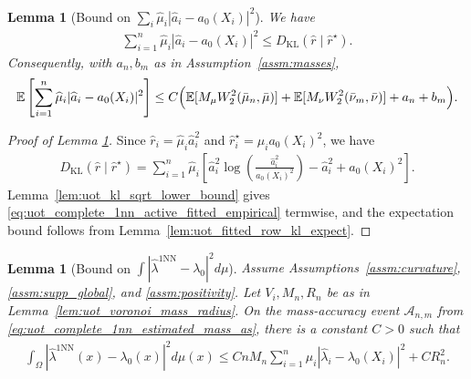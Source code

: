 \documentclass[11pt,reqno]{amsart}
\newtheorem{lemma}[theorem]{Lemma}
\theoremstyle{definition}
\newcommand{\KL}{\mathrm{KL}}
\renewcommand{\hat}{\widehat}
\newcommand{\Ep}{\mathbb{E}}
\begin{document}
\begin{lemma}[Bound on $\sum_i\hat\mu_i|\hat a_i-a_0(X_i)|^2$]
\label{lem:uot_complete_1nn_active_fitted}
We have
\begin{align}
\label{eq:uot_complete_1nn_active_fitted_empirical}
    \sum_{i=1}^n \hat\mu_i
    |\hat a_i-a_0(X_i)|^2
    \le
    {D_\KL}(\hat r\mid \hat r^\star).
\end{align}
Consequently, with $a_n,b_m$ as in Assumption~\ref{assm:masses},
\begin{align}
\label{eq:uot_complete_1nn_active_fitted_expectation}
    \Ep\left[
    \sum_{i=1}^n \hat\mu_i
    |\hat a_i-a_0(X_i)|^2
    \right]
    \le
    C
    \Bigl(
        \Ep[M_\mu W_2^2(\bar\mu_n,\bar\mu)]
        + \Ep[M_\nu W_2^2(\bar\nu_m,\bar\nu)]
        + a_n + b_m
    \Bigr).
\end{align}
\end{lemma}

\begin{proof}[Proof of Lemma \ref{lem:uot_complete_1nn_active_fitted}]
Since $\hat r_i=\hat\mu_i\hat a_i^2$ and $\hat r_i^\star=\hat\mu_i a_0(X_i)^2$, we have
\begin{align*}
    {D_\KL}(\hat r\mid \hat r^\star)
    =
    \sum_{i=1}^n\hat\mu_i
    \left[
        \hat a_i^2
        \log\left(\frac{\hat a_i^2}{a_0(X_i)^2}\right)
        -\hat a_i^2
        +a_0(X_i)^2
    \right].
\end{align*}
Lemma~\ref{lem:uot_kl_sqrt_lower_bound} gives \eqref{eq:uot_complete_1nn_active_fitted_empirical} termwise, and the expectation bound follows from Lemma~\ref{lem:uot_fitted_row_kl_expect}.
\end{proof}

\begin{lemma}[Bound on $\int|\hat\lambda^{1\mathrm{NN}}-\lambda_0|^2 d\mu$]
\label{lem:lambda_1nn_population_extension}
Assume Assumptions~\ref{assm:curvature}, \ref{assm:supp_global}, and \ref{assm:positivity}. Let $V_i,M_n,R_n$ be as in Lemma~\ref{lem:uot_voronoi_mass_radius}. On the mass-accuracy event $\mathcal A_{n,m}$ from \eqref{eq:uot_complete_1nn_estimated_mass_as}, there is a constant $C>0$ such that
\begin{align}
\label{eq:lambda_1nn_population_extension}
    \int_\Omega |\hat\lambda^{\mathrm{1NN}}(x)-\lambda_0(x)|^2d\mu(x)
    \le
    C nM_n\sum_{i=1}^n\hat\mu_i|\hat\lambda_i-\lambda_0(X_i)|^2
    + C R_n^2 .
\end{align}
\end{lemma}
\end{document}
